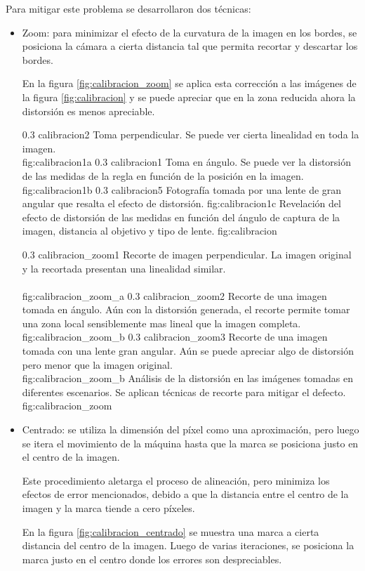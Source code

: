 Para mitigar este problema se desarrollaron dos técnicas:
\begin{itemize}
\item{Zoom: para minimizar el efecto de la curvatura de la imagen en los bordes, se posiciona la cámara a cierta distancia tal que permita recortar y descartar los bordes.\par
      En la figura \ref{fig:calibracion_zoom} se aplica esta corrección a las imágenes de la figura \ref{fig:calibracion} y se puede apreciar que en la zona reducida ahora la distorsión es menos apreciable.}

\subfigabc
   {0.3} {calibracion2} {Toma perpendicular. Se puede ver cierta linealidad en toda la imagen.\\ \vphantom{1}} {fig:calibracion1a}
   {0.3} {calibracion1} {Toma en ángulo. Se puede ver la distorsión de las medidas de la regla en función de la posición en la imagen.} {fig:calibracion1b}
   {0.3} {calibracion5} {Fotografía tomada por una lente de gran angular que resalta el efecto de distorsión.} {fig:calibracion1c}
   {Revelación del efecto de distorsión de las medidas en función del ángulo de captura de la imagen, distancia al objetivo y tipo de lente.}
   {fig:calibracion}

\subfigabc
{0.3} {calibracion_zoom1} {Recorte de imagen perpendicular. La imagen original y la recortada presentan una linealidad similar.\\ \vphantom{1}\\ \vphantom{1}} {fig:calibracion_zoom_a}
   {0.3} {calibracion_zoom2} {Recorte de una imagen tomada en ángulo. Aún con la distorsión generada, el recorte permite tomar una zona local sensiblemente mas lineal que la imagen completa.} {fig:calibracion_zoom_b}
   {0.3} {calibracion_zoom3} {Recorte de una imagen tomada con una lente gran angular. Aún se puede apreciar algo de distorsión pero menor que la imagen original.\\ \vphantom{1}} {fig:calibracion_zoom_b}
   {Análisis de la distorsión en las imágenes tomadas en diferentes escenarios. Se aplican técnicas de recorte para mitigar el defecto.}
   {fig:calibracion_zoom}

   \item{Centrado: se utiliza la dimensión del píxel como una aproximación, pero luego se itera el movimiento de la máquina hasta que la marca se posiciona justo en el centro de la imagen.\par
         Este procedimiento aletarga el proceso de alineación, pero minimiza los efectos de error mencionados, debido a que la distancia entre el centro de la imagen y la marca tiende a cero píxeles.\par
         En la figura \ref{fig:calibracion_centrado} se muestra una marca a cierta distancia del centro de la imagen. Luego de varias iteraciones, se posiciona la marca justo en el centro donde los errores son despreciables.}
   \end{itemize}


